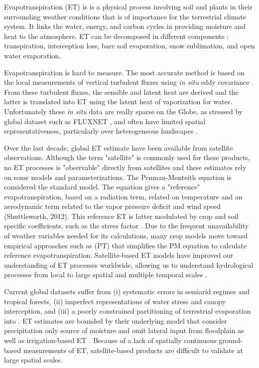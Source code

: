 \documentclass[draft]{agujournal2019}
\begin{document}
Evapotranspiration (ET) is is a physical process involving soil and plants in their surrounding weather conditions that is of importance for the terrestrial climate system. It links the water, energy, and carbon cycles \cite{Fisher2017} in providing moisture and heat to the atmosphere. ET can be decomposed in different components : transpiration, interception loss, bare soil evaporation, snow sublimation, and open water evaporation.


Evapotranspiration is hard to measure. The most accurate method is based on the local measurements of vertical turbulent fluxes using {\it in situ} eddy covariance \cite{falge2016}. From these turbulent fluxes, the sensible and latent heat are derived and the latter is translated into ET using the latent heat of vaporization for water. Unfortunately these {\it in situ} data are really sparse on the Globe, as stressed by global dataset such as FLUXNET \cite{falge2016}, and often have limited spatial representativeness, particularly over heterogeneous landscapes \cite{Miralles2011}.

Over the last decade, global ET estimate have been available from satellite observations. Although the term "satellite" is commonly used for these products, no ET processes is "observable" directly from satellites and these estimates rely on some models and parameterizations. The Penman-Monteith equation \cite{Penman1948a, Monteith1965a} is considered the standard model. The equation gives a "reference" evapotranspiration, based on a radiation term, related on temperature  and an aerodynamic term related to the vapor pressure deficit and wind speed (Shuttleworth, 2012). This reference ET is latter modulated by crop and soil specific coefficients, such as the stress factor \cite{Penman1948a, Monteith1965a}. Due to the frequent unavailability of weather variables needed for its calculations, many crop models move toward empirical approaches such as \cite{PRIESTLEY1972} (PT) that simplifies the PM equation to calculate reference evapotranspiration. Satellite-based ET models have improved our understanding of ET processes worldwide, allowing us to understand hydrological processes from local to large spatial and multiple temporal scales \cite{Fassoni-Andrade2021}. 


Current global datasets suffer from (i) systematic errors in semiarid regimes and tropical forests, (ii) imperfect representations of water stress and canopy interception, and (iii) a poorly constrained partitioning of terrestrial evaporation into  \cite{Dorigo2021}. ET estimates are bounded by their underlying model that consider precipitation only source of moisture and omit lateral input from floodplain as well as irrigation-based ET \cite{VanDijk2018}. Because of a lack of spatially continuous ground-based measurements of ET, satellite-based products are difficult to validate at large spatial scales.
\end{document}
